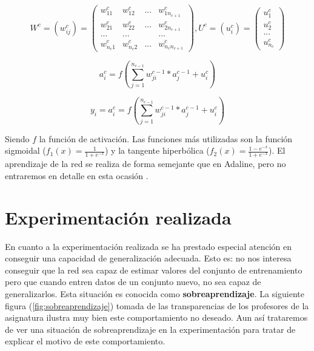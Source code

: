 \documentclass[11pt,spanish,listoffigures,listoftables]{tfgetsinf}
\begin{document}
\begin{equation}\label{eq:ej6}
W^c = (w_{ij}^c) = \begin{pmatrix}
w_{11}^c & w_{12}^c & ... & w_{1n_{c+1}}^c\\ 
w_{21}^c & w_{22}^c & ... & w_{2n_{c+1}}^c\\ 
... & ... & & ...\\ 
w_{n_{c}1}^c & w_{n_{c}2}^c & ... & w_{n_{c}n_{c+1}}^c 
\end{pmatrix}  ,  U^c = (u_{i}^c) = \begin{pmatrix}
u_{1}^c\\ 
u_{2}^c\\ 
...\\ 
u_{n_{c}}^c 
\end{pmatrix}
\end{equation}

\begin{equation}\label{eq:ej7}
a_{i}^c = f(\sum_{j=1}^{n_{c-1}}w_{ji}^{c-1}*a_{j}^{c-1} + u_{i}^{c})
\end{equation} 

\begin{equation}\label{eq:ej8}
y_{i} = a_{i}^c = f(\sum_{j=1}^{n_{c-1}}w_{ji}^{c-1}*a_{j}^{c-1} + u_{i}^{c})
\end{equation} 

\par Siendo $f$ la función de activación. Las funciones más utilizadas son la función sigmoidal ($f_{1}(x) = \frac{1}{1+e^{-x}}$) y la tangente hiperbólica ($f_{2}(x) = \frac{1-e^{-x}}{1+e^{-x}}$). El aprendizaje de la red se realiza de forma semejante que en Adaline, pero no entraremos en detalle en esta ocasión \cite{MLP}.

\section{Experimentación realizada}

\par En cuanto a la experimentación realizada se ha prestado especial atención en conseguir una capacidad de generalización adecuada. Esto es: no nos interesa conseguir que la red sea capaz de estimar valores del conjunto de entrenamiento pero que cuando entren datos de un conjunto nuevo, no sea capaz de generalizarlos. Esta situación es conocida como \textbf{sobreaprendizaje}. La siguiente figura (\ref{fig:sobreaprendizaje}) tomada de las transparencias de los profesores de la asignatura ilustra muy bien este comportamiento no deseado. Aun así trataremos de ver una situación de sobreaprendizaje en la experimentación para tratar de explicar el motivo de este comportamiento.
\end{document}
